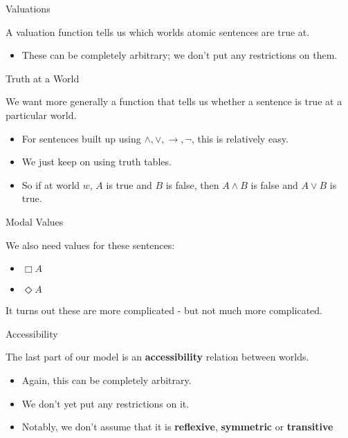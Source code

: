 \documentclass[
  ignorenonframetext,
]{beamer}
\providecommand{\tightlist}{%
  \setlength{\itemsep}{0pt}\setlength{\parskip}{0pt}}
\renewcommand{\,}{\text{, }}
\begin{document}
\begin{frame}{Valuations}
\protect\hypertarget{valuations}{}

A valuation function tells us which worlds atomic sentences are true at.

\begin{itemize}
\tightlist
\item
  These can be completely arbitrary; we don't put any restrictions on
  them.
\end{itemize}

\end{frame}

\begin{frame}{Truth at a World}
\protect\hypertarget{truth-at-a-world}{}

We want more generally a function that tells us whether a sentence is
true at a particular world.

\begin{itemize}
\tightlist
\item
  For sentences built up using \(\wedge, \vee, \rightarrow, \neg\), this
  is relatively easy.
\item
  We just keep on using truth tables.
\item
  So if at world \(w\), \(A\) is true and \(B\) is false, then
  \(A \wedge B\) is false and \(A \vee B\) is true.
\end{itemize}

\end{frame}

\begin{frame}{Modal Values}
\protect\hypertarget{modal-values}{}

We also need values for these sentences:

\begin{itemize}
\tightlist
\item
  \(\Box A\)
\item
  \(\Diamond A\)
\end{itemize}

It turns out these are more complicated - but not much more complicated.

\end{frame}

\begin{frame}{Accessibility}
\protect\hypertarget{accessibility}{}

The last part of our model is an \textbf{accessibility} relation between
worlds.

\begin{itemize}
\tightlist
\item
  Again, this can be completely arbitrary.
\item
  We don't yet put any restrictions on it.
\item
  Notably, we don't assume that it is \textbf{reflexive},
  \textbf{symmetric} or \textbf{transitive}
\end{itemize}

\end{frame}
\end{document}
